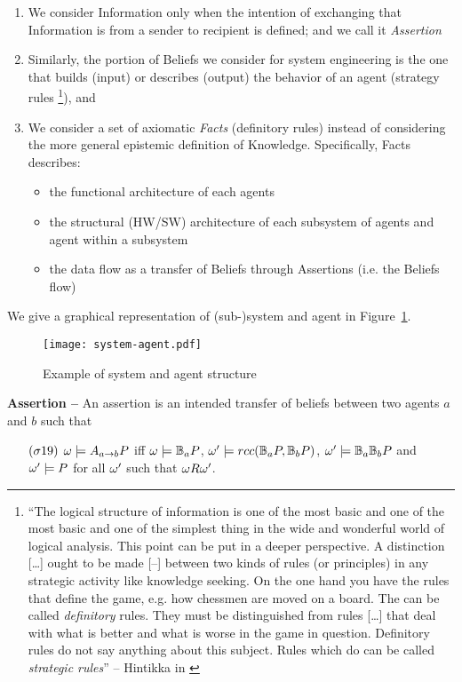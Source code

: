 \begin{enumerate}
	\item We consider Information only when the intention of exchanging 
		that Information is from a sender to 
		recipient is defined; and we call it \emph{Assertion}  
	\item Similarly, the portion of Beliefs we consider for system
		engineering is the one that builds (input) or describes
		(output) the behavior of an agent (strategy rules
		\footnote{``The logical structure of information is one of the
		most basic and one of the most basic and one of the simplest
		thing in the wide and wonderful world of logical analysis. This
		point can be put in a deeper perspective. A distinction
		[\ldots] ought to be made [--] between two kinds of rules (or
		principles) in any strategic activity like knowledge seeking.
		On the one hand you have the rules that define the game, e.g.
		how chessmen are moved on a board. The can be called
		\emph{definitory} rules.  They must be distinguished from rules
		[\ldots] that deal with what is better and what is worse in the
		game in question.  Definitory rules do not say anything about
		this subject. Rules which do can be called \emph{strategic
		rules}'' -- Hintikka in \autocite{Hintikka1993Information}}),
		and
	\item We consider a set of axiomatic \emph{Facts} (definitory rules) instead
		of considering the more general epistemic definition of
		Knowledge. Specifically, Facts describes:
		\begin{itemize}
			\item the functional architecture of each agents
			\item the structural (HW/SW) architecture of each
				subsystem of agents and agent within a
				subsystem
			\item the data flow as a transfer of Beliefs through
				Assertions (i.e. the Beliefs flow)
		\end{itemize}
\end{enumerate}

We give a graphical representation of (sub-)system and agent in Figure~\ref{fig:system-agent}.

\begin{figure}[t]
	\centering
	\texttt{[image: system-agent.pdf]}
	\caption{Example of system and agent structure}
	\label{fig:system-agent}
\end{figure}

\begin{definition}{\bf Assertion -- }\label{def:assertion}
	An assertion is an intended transfer of beliefs between
	two agents $a$ and $b$ such that
	\begin{enumerate}[noitemsep]
		\item[$(\sigma19)$] $\omega\models A_{a\rightarrow b}P$ iff
			$\omega\models\mathbb{B}_{a}{P}$, 
			$\omega'\models rcc(\mathbb{B}_{a}{P},\mathbb{B}_{b}{P})$, 
			$\omega'\models\mathbb{B}_{a}{\mathbb{B}_{b}{P}}$
			and $\omega'\models P$ for all
			$\omega'$ such that $\omega R\omega'$.
	\end{enumerate}
\end{definition}


